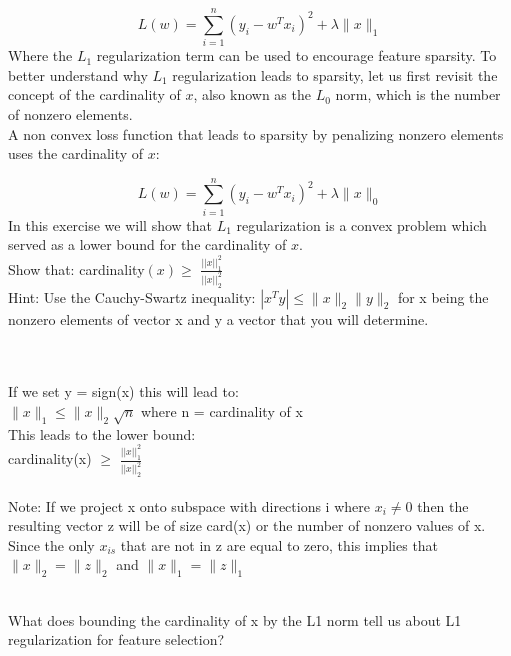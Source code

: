 \begin{Parts}
$$L(w) = \sum_{i=1}^{n} (y_i - w^T x_i)^2 + \lambda \|x \|_1$$
Where the $L_1$ regularization term can be used to encourage feature sparsity. To better understand why $L_1$ regularization leads to sparsity, let us first revisit the concept of the cardinality of $x$, also known as the $L_0$ norm, which is the number of nonzero elements. \\
A non convex loss function that leads to sparsity by penalizing nonzero elements uses the cardinality of $x$:

$$L(w) = \sum_{i=1}^{n} (y_i - w^T x_i)^2 + \lambda \|x \|_0$$ 
In this exercise we will show that $L_1$ regularization is a convex problem which served as a lower bound for the cardinality of $x$.\\

Show that: cardinality$(x) \geq$ $\frac{||x||_1^2}{||x||_2^2}$ \\
Hint: Use the Cauchy-Swartz inequality: $ |x^Ty| \leq \|x\|_2 \|y\|_2$ for x being the nonzero elements of vector x and y a vector that you will determine. \\
\\\indent \\
\begin{solution}
If we set y = sign(x) this will lead to: \\ 
$ \| x \|_1 \leq \|x\|_2 \sqrt{n}$ where n = cardinality of x \\
This leads to the lower bound: \\
cardinality(x) $\geq$ $\frac{||x||_1^2}{||x||_2^2}$ \\
\\\indent
Note: If we project x onto subspace with directions i where $x_i \neq 0$ then the resulting vector z will be of size card(x) or the number of nonzero values of x. 
Since the only $x_{is}$ that are not in z are equal to zero, this implies that $\lVert x\rVert_2 = \lVert z\rVert_2$ and  $\lVert x\rVert_1 = \lVert z\rVert_1$ \\ \\
\end{solution}
 
\Part What does bounding the cardinality of x by the L1 norm tell us about L1 regularization for feature selection?

\end{Parts}

\newpage
